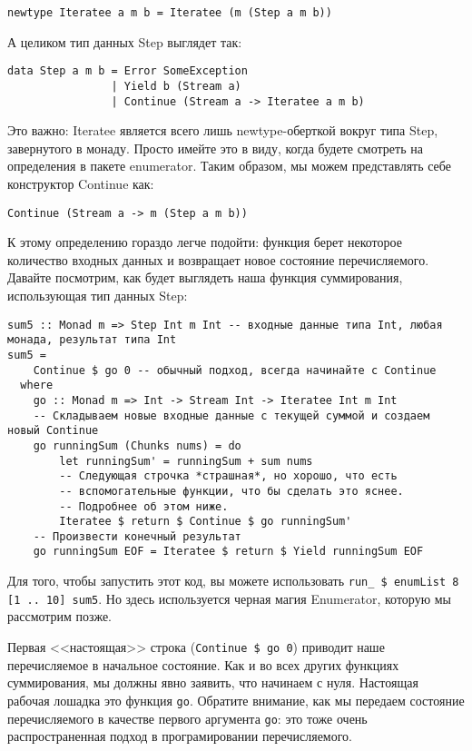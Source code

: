 \begin{lstlisting}
newtype Iteratee a m b = Iteratee (m (Step a m b))
\end{lstlisting}

А целиком тип данных Step выглядет так:

\begin{lstlisting}
data Step a m b = Error SomeException 
                | Yield b (Stream a) 
                | Continue (Stream a -> Iteratee a m b)
\end{lstlisting}

Это важно: Iteratee является всего лишь newtype-оберткой вокруг типа Step, завернутого в монаду. Просто имейте это в виду, когда будете смотреть на определения в пакете enumerator. Таким образом, мы можем представлять себе конструктор Continue как:

\begin{lstlisting}
Continue (Stream a -> m (Step a m b))
\end{lstlisting}

К этому определению гораздо легче подойти: функция берет некоторое количество входных данных и возвращает новое состояние перечисляемого. Давайте посмотрим, как будет выглядеть наша функция суммирования, использующая тип данных Step:

\begin{lstlisting}
sum5 :: Monad m => Step Int m Int -- входные данные типа Int, любая монада, результат типа Int
sum5 =
    Continue $ go 0 -- обычный подход, всегда начинайте с Continue
  where
    go :: Monad m => Int -> Stream Int -> Iteratee Int m Int
    -- Складываем новые входные данные с текущей суммой и создаем новый Continue
    go runningSum (Chunks nums) = do
        let runningSum' = runningSum + sum nums
        -- Следующая строчка *страшная*, но хорошо, что есть 
        -- вспомогательные функции, что бы сделать это яснее.
        -- Подробнее об этом ниже.
        Iteratee $ return $ Continue $ go runningSum'
    -- Произвести конечный результат
    go runningSum EOF = Iteratee $ return $ Yield runningSum EOF
\end{lstlisting}%

\begin{remark}
Для того, чтобы запустить этот код, вы можете использовать \lstinline'run_ $ enumList 8 [1 .. 10] sum5'. Но здесь используется черная магия Enumerator, которую мы рассмотрим позже.
\end{remark}

Первая <<настоящая>> строка (\lstinline'Continue $ go 0') приводит наше перечисляемое в начальное состояние. Как и во всех других функциях суммирования, мы должны явно заявить, что начинаем с нуля. Настоящая рабочая лошадка это функция \lstinline'go'. Обратите внимание, как мы передаем состояние перечисляемого в качестве первого аргумента \lstinline'go': это тоже очень распространенная подход в програмировании перечисляемого.

